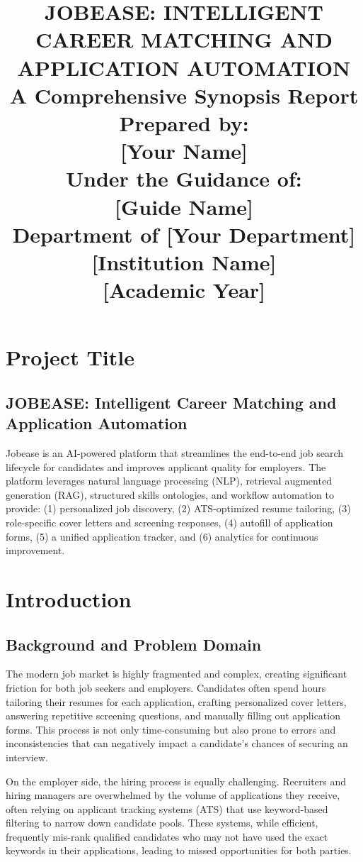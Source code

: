 \documentclass[12pt,a4paper]{report}
\title{
    \Huge{\textbf{JOBEASE: INTELLIGENT CAREER MATCHING AND APPLICATION AUTOMATION}} \\
    \vspace{1cm}
    \Large{A Comprehensive Synopsis Report} \\
    \vspace{2cm}
    \large{Prepared by:} \\
    \large{[Your Name]} \\
    \vspace{1cm}
    \large{Under the Guidance of:} \\
    \large{[Guide Name]} \\
    \vspace{2cm}
    \large{Department of [Your Department]} \\
    \large{[Institution Name]} \\
    \large{[Academic Year]}
}
\author{}
\date{}
\begin{document}
\maketitle
\thispagestyle{empty}

\newpage
\tableofcontents
\thispagestyle{empty}

\newpage
\setcounter{page}{1}

\chapter{Project Title}
\section*{JOBEASE: Intelligent Career Matching and Application Automation}

Jobease is an AI-powered platform that streamlines the end-to-end job search lifecycle for candidates and improves applicant quality for employers. The platform leverages natural language processing (NLP), retrieval augmented generation (RAG), structured skills ontologies, and workflow automation to provide: (1) personalized job discovery, (2) ATS-optimized resume tailoring, (3) role-specific cover letters and screening responses, (4) autofill of application forms, (5) a unified application tracker, and (6) analytics for continuous improvement.

\chapter{Introduction}

\section*{Background and Problem Domain}

The modern job market is highly fragmented and complex, creating significant friction for both job seekers and employers. Candidates often spend hours tailoring their resumes for each application, crafting personalized cover letters, answering repetitive screening questions, and manually filling out application forms. This process is not only time-consuming but also prone to errors and inconsistencies that can negatively impact a candidate's chances of securing an interview.

On the employer side, the hiring process is equally challenging. Recruiters and hiring managers are overwhelmed by the volume of applications they receive, often relying on applicant tracking systems (ATS) that use keyword-based filtering to narrow down candidate pools. These systems, while efficient, frequently mis-rank qualified candidates who may not have used the exact keywords in their applications, leading to missed opportunities for both parties.
\end{document}
